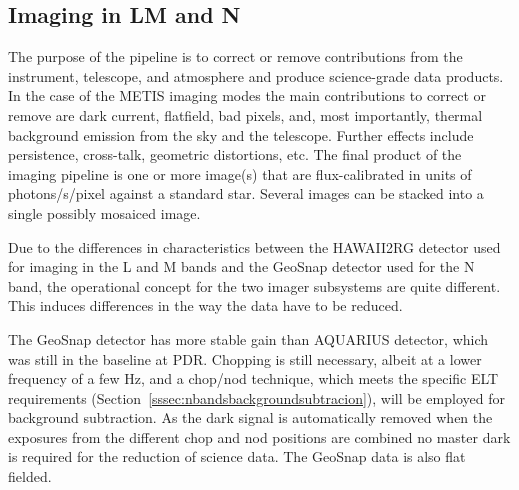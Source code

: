 \subsection{Imaging in LM and N}
\label{ssec:overview_lm_imaging}


The purpose of the pipeline is to correct or remove contributions from
the instrument, telescope, and atmosphere and produce science-grade
data products.  In the case of the METIS imaging modes the main
contributions to correct or remove are dark current, flatfield, bad
pixels, and, most importantly, thermal background emission from the
sky and the telescope. Further effects include persistence,
cross-talk, geometric distortions, etc. The final product of the
imaging pipeline is one or more image(s) that are flux-calibrated in units of
photons/s/pixel against a standard star.
Several images can be stacked into a single possibly mosaiced image.

Due to the differences in characteristics between the HAWAII2RG
detector used for imaging in the L and M bands and the GeoSnap
detector used for the N band, the operational concept for the two
imager subsystems are quite different. This induces differences in the
way the data have to be reduced.

The GeoSnap detector has more stable gain than AQUARIUS detector,
which was still in the baseline at PDR\@. Chopping is still necessary, albeit
at a lower frequency of a few Hz, and a chop/nod technique, which meets the
specific ELT requirements (Section~\ref{sssec:nbandsbackgroundsubtracion}),
will be employed  for background subtraction.  As the dark
signal is automatically removed when the exposures from the different
chop and nod positions are combined no master dark is required for the
reduction of science data. The GeoSnap data is also flat fielded.

